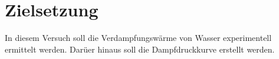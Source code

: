 \section{Zielsetzung}
\label{sec:Zielsetzung}
In diesem Versuch soll die Verdampfungswärme von Wasser experimentell ermittelt
werden. Darüer hinaus soll die Dampfdruckkurve erstellt werden.